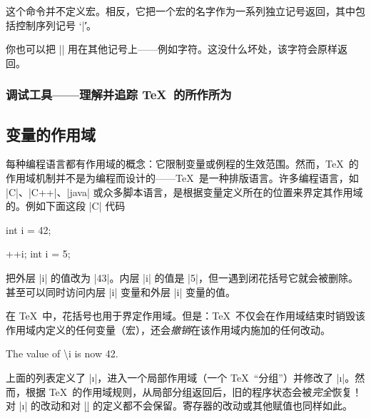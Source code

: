 \documentclass[a4paper,doc2]{ltxdoc}
\begin{document}
\begin{command}{\string{}}
	这个命令并不定义宏。相反，它把一个宏的名字作为一系列独立记号返回，其中包括控制序列记号 `|\|'。

	你也可以把 |\string| 用在其他记号上——例如字符。这没什么坏处，该字符会原样返回。
\end{command}

\subsubsection{调试工具——理解并追踪 \TeX\ 的所作所为}
\begin{command}{\message{}}
\end{command}
\begin{command}{\meaning{}}
\end{command}
\begin{command}{}
\end{command}
\begin{command}{}
\end{command}
\begin{command}{}
\end{command}

\subsection{变量的作用域}
\label{sec:scopes}
每种编程语言都有作用域的概念：它限制变量或例程的生效范围。然而，\TeX\ 的作用域机制并不是为编程而设计的——\TeX\ 是一种排版语言。许多编程语言，如 |C|、|C++|、|java| 或众多脚本语言，是根据变量定义所在的位置来界定其作用域的。例如下面这段 |C| 代码
\begin{codeexample}
int i = 42;

{
	++i;
	int i = 5;
}
\end{codeexample}
\noindent 把外层 |i| 的值改为 |43|。内层 |i| 的值是 |5|，但一遇到闭花括号它就会被删除。甚至可以同时访问内层 |i| 变量和外层 |i| 变量的值。

在 \TeX\ 中，花括号也用于界定作用域。但是：\TeX\ 不仅会在作用域结束时销毁该作用域内定义的任何变量（宏），还会\emph{撤销}在该作用域内施加的任何改动。
\begin{codeexample}[]
\def\i{42}
{
	\def\i{43}
	\def\b{2}
}
The value of \textbackslash i is now \i.
\end{codeexample}
\noindent 上面的列表定义了 |\i|，进入一个局部作用域（一个 \TeX\ ``分组''）并修改了 |\i|。然而，根据 \TeX\ 的作用域规则，从局部分组返回后，旧的程序状态会被\emph{完全}恢复！对 |\i| 的改动和对 |\b| 的定义都不会保留。寄存器的改动或其他赋值也同样如此。
\end{document}
